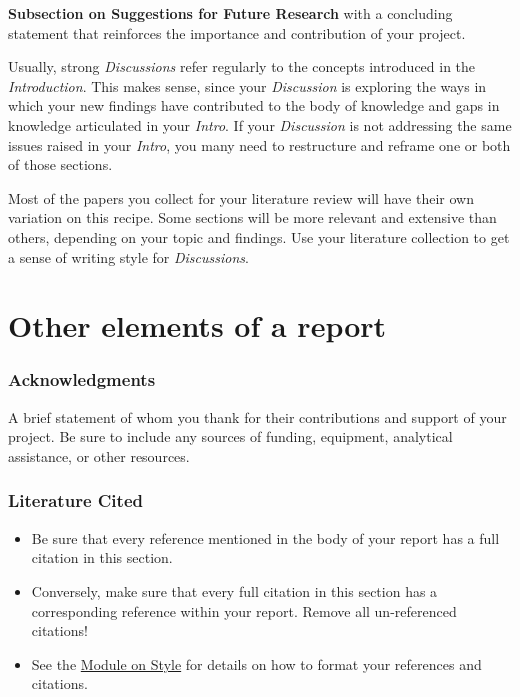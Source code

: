 \documentclass[]{book}
\begin{document}
\textbf{Subsection on Suggestions for Future Research} with a concluding statement that reinforces the importance and contribution of your project.

Usually, strong \emph{Discussions} refer regularly to the concepts introduced in the \emph{Introduction}. This makes sense, since your \emph{Discussion} is exploring the ways in which your new findings have contributed to the body of knowledge and gaps in knowledge articulated in your \emph{Intro}. If your \emph{Discussion} is not addressing the same issues raised in your \emph{Intro}, you many need to restructure and reframe one or both of those sections.

Most of the papers you collect for your literature review will have their own variation on this recipe. Some sections will be more relevant and extensive than others, depending on your topic and findings. Use your literature collection to get a sense of writing style for \emph{Discussions}.

\hypertarget{other-elements-of-a-report}{%
\section*{Other elements of a report}\label{other-elements-of-a-report}}

\hypertarget{acknowledgments}{%
\subsubsection*{Acknowledgments}\label{acknowledgments}}

A brief statement of whom you thank for their contributions and support of your project. Be sure to include any sources of funding, equipment, analytical assistance, or other resources.

\hypertarget{literature-cited}{%
\subsubsection*{Literature Cited}\label{literature-cited}}

\begin{itemize}
\item
  Be sure that every reference mentioned in the body of your report has a full citation in this section.
\item
  Conversely, make sure that every full citation in this section has a corresponding reference within your report. Remove all un-referenced citations!
\item
  See the \protect\hyperlink{style}{Module on Style} for details on how to format your references and citations.
\end{itemize}
\end{document}
